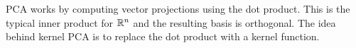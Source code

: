 
PCA works by computing vector projections using the dot product.
This is the typical inner product for \(\mathbb{R}^n\) and the resulting basis is orthogonal.
The idea behind kernel PCA is to replace the dot product with a kernel function.

